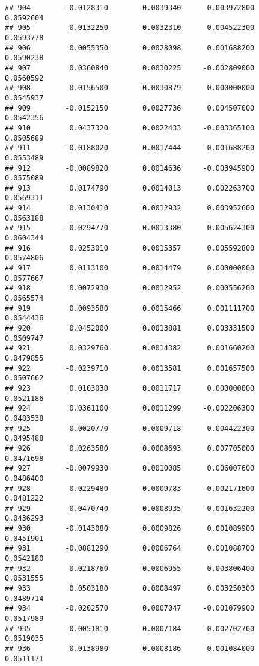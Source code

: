 \documentclass[
]{article}
\begin{document}
\begin{verbatim}
## 904        -0.0128310        0.0039340      0.003972800             0.0592604
## 905         0.0132250        0.0032310      0.004522300             0.0593778
## 906         0.0055350        0.0028098      0.001688200             0.0590238
## 907         0.0360840        0.0030225     -0.002809000             0.0560592
## 908         0.0156500        0.0030879      0.000000000             0.0545937
## 909        -0.0152150        0.0027736      0.004507000             0.0542356
## 910         0.0437320        0.0022433     -0.003365100             0.0505689
## 911        -0.0188020        0.0017444     -0.001688200             0.0553489
## 912        -0.0089820        0.0014636     -0.003945900             0.0575089
## 913         0.0174790        0.0014013      0.002263700             0.0569311
## 914         0.0130410        0.0012932      0.003952600             0.0563188
## 915        -0.0294770        0.0013380      0.005624300             0.0604344
## 916         0.0253010        0.0015357      0.005592800             0.0574806
## 917         0.0113100        0.0014479      0.000000000             0.0577667
## 918         0.0072930        0.0012952      0.000556200             0.0565574
## 919         0.0093580        0.0015466      0.001111700             0.0544436
## 920         0.0452000        0.0013881      0.003331500             0.0509747
## 921         0.0329760        0.0014382      0.001660200             0.0479855
## 922        -0.0239710        0.0013581      0.001657500             0.0507662
## 923         0.0103030        0.0011717      0.000000000             0.0521186
## 924         0.0361100        0.0011299     -0.002206300             0.0483538
## 925         0.0020770        0.0009718      0.004422300             0.0495488
## 926         0.0263580        0.0008693      0.007705000             0.0471698
## 927        -0.0079930        0.0010085      0.006007600             0.0486400
## 928         0.0229480        0.0009783     -0.002171600             0.0481222
## 929         0.0470740        0.0008935     -0.001632200             0.0436293
## 930        -0.0143080        0.0009826      0.001089900             0.0451901
## 931        -0.0881290        0.0006764      0.001088700             0.0542180
## 932         0.0218760        0.0006955      0.003806400             0.0531555
## 933         0.0503180        0.0008497      0.003250300             0.0489714
## 934        -0.0202570        0.0007047     -0.001079900             0.0517989
## 935         0.0051810        0.0007184     -0.002702700             0.0519035
## 936         0.0138980        0.0008186     -0.001084000             0.0511171

\end{verbatim}
\end{document}
